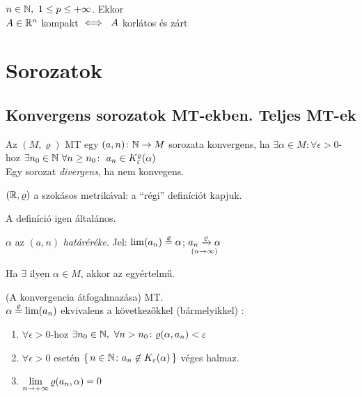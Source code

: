 \begin{te}
  $n\in\mathbb{N},\ 1\leq p\leq +\infty$. Ekkor\\
  $A\in\mathbb{R}^n$ kompakt $\iff\ A$ korlátos és zárt
\end{te}


\newpage
\section{Sorozatok}


\subsection{Konvergens sorozatok MT-ekben. Teljes MT-ek}

\begin{de}
  Az $(M, \varrho)$ MT egy $(a,n)\colon \mathbb{N}\to M$ sorozata konvergens,
  ha $\exists \alpha \in M\!\colon \forall \epsilon>0$-hoz $\exists
  n_0\in \mathbb{N} \ \forall n\geq n_0\colon\ a_n \in
  K_\varepsilon^\varrho(\alpha)$\\
  Egy sorozat \emph{divergens}, ha nem konvegens.
\end{de}

\begin{Megj}
\item $(\mathbb{R},\varrho)$ a szokásos metrikával: a ``régi'' definíciót
  kapjuk.
\item A definíció igen általános.
\item     $\alpha$ az $(a,n)$ \emph{határéréke}. Jel: $\lim (a_n)
  \stackrel{\varrho}{=}\alpha$; $\underset{(n\to\infty)}{a_n\xrightarrow{\varrho} \alpha}$
\end{Megj}

\begin{te}
  Ha $\exists$ ilyen $\alpha\in M$, akkor az egyértelmű.
\end{te}

\begin{te}(A konvergencia átfogalmazása)
  \MT MT.\\
  $\alpha \stackrel{\varrho}{=} \lim(a_n)$ ekvivalens a
  következőkkel (bármelyikkel) :
  \begin{enumerate}[\ i)]
  \item $\forall \epsilon >0$-hoz $\exists n_0\in \mathbb{N},\ \forall
    n>n_0\colon \varrho(\alpha,a_n)<\varepsilon$
  \item $\forall \epsilon>0$ esetén $\{\,n\in\mathbb{N}\colon a_n\not\in
    K_\varepsilon(\alpha)\,\}$ véges halmaz.
  \item $\displaystyle \lim_{n\to +\infty} \varrho(a_n,\alpha) = 0$
  \end{enumerate}
\end{te}

